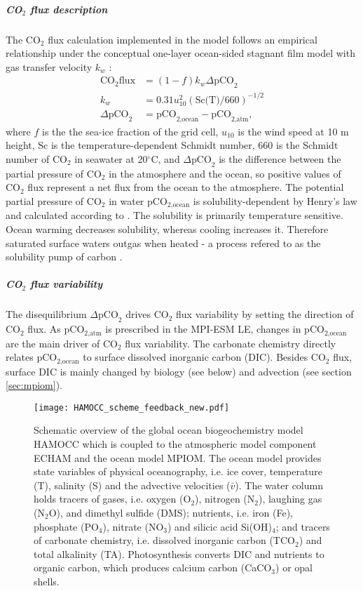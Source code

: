 \documentclass[12pt]{article}
\begin{document}
\subparagraph{CO$_2$ flux description}
The CO$_2$ flux calculation implemented in the model follows an empirical relationship under the conceptual one-layer ocean-sided stagnant film model with gas transfer velocity $k_w$ \citep{Wanninkhof1992}: 
\begin{align*}
\text{CO}_2\text{flux} &= (1-f)k_w \Delta \text{pCO}_2 \\
				k_w &= 0.31 u_{10}^2(\text{Sc(T)}/660)^{-1/2}\\
				\Delta \text{pCO}_2 &= \text{pCO}_{2\text{,ocean}} - \text{pCO}_{2\text{,atm}} \text{,}
\end{align*}
where $f$ is the the sea-ice fraction of the grid cell, $u_{10}$ is the wind speed at 10 m height, $\text{Sc}$ is the temperature-dependent Schmidt number, 660 is the Schmidt number of CO$_2$ in seawater at 20$^\circ$C, and $\Delta \text{pCO}_2$ is the difference between the partial pressure of CO$_2$ in the atmosphere and the ocean, so positive values of CO$_2$ flux represent a net flux from the ocean to the atmosphere. The potential partial pressure of CO$_2$ in water pCO$_{2\text{,ocean}}$ is solubility-dependent by Henry's law and calculated according to \citep{Weiss1974}. The solubility is primarily temperature sensitive. Ocean warming decreases solubility, whereas cooling increases it. Therefore saturated surface waters outgas when heated - a process refered to as the solubility pump of carbon \citep{VolkHoffert1985}.

\subparagraph{CO$_2$ flux variability}
The disequilibrium $\Delta \text{pCO}_\text{2}$ drives CO$_2$ flux variability by setting the direction of CO$_2$ flux. As pCO$_{2\text{,atm}}$ is prescribed in the MPI-ESM LE, changes in pCO$_{2\text{,ocean}}$ are the main driver of CO$_2$ flux variability. The carbonate chemistry directly relates pCO$_{2\text{,ocean}}$ to surface dissolved inorganic carbon (DIC). Besides CO$_2$ flux, surface DIC is mainly changed by biology (see below) and advection (see section \ref{sec:mpiom}). 

\begin{figure}[h!]
	\centering
	\texttt{[image: HAMOCC\_scheme\_feedback\_new.pdf]}
	\caption{Schematic overview of the global ocean biogeochemistry model HAMOCC \citep{Ilyina2013} which is coupled to the atmospheric model component ECHAM and the ocean model MPIOM. The ocean model provides state variables of physical oceanography, i.e. ice cover, temperature (T), salinity (S) and the advective velocities ($\bar{v}$).
	 The water column holds tracers of gases, i.e. oxygen (O$_2$), nitrogen (N$_2$), laughing gas (N$_2$O), and dimethyl sulfide (DMS); nutrients, i.e. iron (Fe), phosphate (PO$_4$), nitrate (NO$_3$) and silicic acid Si(OH)$_4$; and tracers of carbonate chemistry, i.e. dissolved inorganic carbon (TCO$_2$) and total alkalinity (TA). Photosynthesis converts DIC and nutrients to organic carbon, which produces calcium carbon (CaCO$_3$) or opal shells.}
	\label{fig:HAMOCC}
\end{figure}
\end{document}
